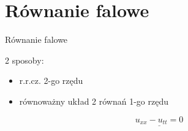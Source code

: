 \section{Równanie falowe}

\begin{frame}{Równanie falowe}
  \begin{block}{2 sposoby:}
\begin{itemize}    
\item r.r.cz. 2-go rzędu
\item równoważny układ 2 równań 1-go rzędu
\end{itemize}
  \end{block}
\begin{equation} \label{etykieta}\underline{u_{xx} - u_{tt} = 0} \end{equation}
\end{frame}

